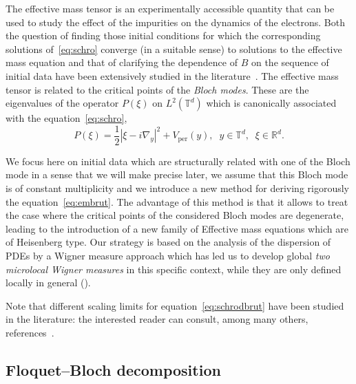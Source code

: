 \documentclass[10pt]{amsart}
\theoremstyle{definition}
\DeclareMathOperator{\per}{per}
\newcommand*\R{{\mathbb R}}
\newcommand*\T{{\mathbb T}}
\numberwithin{equation}{section}
\begin{document}
The effective mass tensor is an experimentally accessible quantity that can be used to study the effect of the impurities on the dynamics of the electrons. Both the question of finding those initial conditions for which the corresponding solutions of~\eqref{eq:schro} converge (in a suitable sense) to solutions to the effective mass equation and that of clarifying the dependence of $B$ on the sequence of initial data have been extensively studied in the literature~\cite{AP05,BBA11,BLP78,HW11,PR96}. The effective mass tensor is related to the critical points of the \emph{Bloch modes}. These are the eigenvalues of the operator $P(\xi)$ on $L^2(\T^d)$ which is canonically associated with the equation~\eqref{eq:schro},
\begin{equation}\label{def:P}
P(\xi)=\frac{1}{2} |\xi-i\nabla_y|^2 +V_{\per}(y),\;\; y\in\T^d,\;\;\xi\in\R^d.
\end{equation}

We focus here on initial data which are structurally related with one of the Bloch mode in a sense that we will make precise later, we assume that this Bloch mode is of constant multiplicity and we introduce a new method for deriving rigorously the equation~\eqref{eq:embrut}. The advantage of this method is that it allows to treat the case where the critical points of the considered Bloch modes are degenerate, leading to the introduction of a new family of Effective mass equations which are of Heisenberg type. Our strategy is based on the analysis of the dispersion of PDEs by a Wigner measure approach which has led us to develop global \emph{two microlocal Wigner measures} in this specific context, while they are only defined locally in general (\cite{F2micro:00,F2micro:05}).


Note that different scaling limits for equation~\eqref{eq:schrodbrut} have been studied in the literature: the interested reader can consult, among many others, references~\cite{AP06,BMP01,CS12,DGR06,Ge91,GMMP,HST:01,PR96, PST:03}.



\subsection{Floquet--Bloch decomposition}\label{sec:FB}
\end{document}
